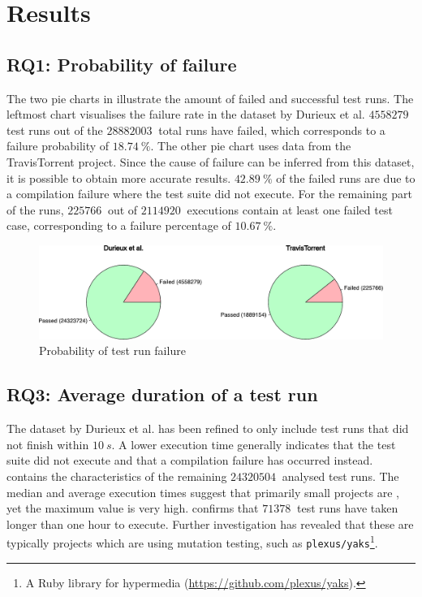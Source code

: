
\section{Results}

\subsection{RQ1: Probability of failure}\label{ssec:results-rq1}
The two pie charts in  illustrate the amount of failed and successful test runs. The leftmost chart visualises the failure rate in the dataset \cite{travisanalysis} by Durieux et al. $\SI{4558279}{}$ test runs out of the $\SI{28882003}{}$ total runs have failed, which corresponds to a failure probability of $\SI{18.74}{\percent}$. The other pie chart uses data from the TravisTorrent \cite{msr17challenge} project. Since the cause of failure can be inferred from this dataset, it is possible to obtain more accurate results. $\SI{42.89}{\percent}$ of the failed runs are due to a compilation failure where the test suite did not execute. For the remaining part of the runs, $\SI{225766}{}$ out of $\SI{2114920}{}$ executions contain at least one failed test case, corresponding to a failure percentage of $\SI{10.67}{\percent}$.

\begin{figure}[htbp!]
	\centering
	\includegraphics[width=\textwidth]{assets/charts/rq1-failure-probability.pdf}
	\caption{Probability of test run failure}
	\label{fig:rq1-failure-probability}
\end{figure}

\subsection{RQ3: Average duration of a test run}
The dataset by Durieux et al. \cite{travisanalysis} has been refined to only include test runs that did not finish within $\SI{10}{s}$. A lower execution time generally indicates that the test suite did not execute and that a compilation failure has occurred instead.  contains the characteristics of the remaining $\SI{24320504}{}$ analysed test runs. The median and average execution times suggest that primarily small projects are \travisci{}, yet the maximum value is very high.  confirms that $\SI{71378}{}$ test runs have taken longer than one hour to execute. Further investigation has revealed that these are typically projects which are using mutation testing, such as \texttt{plexus/yaks}\footnote{A Ruby library for hypermedia (\url{https://github.com/plexus/yaks}).}.

